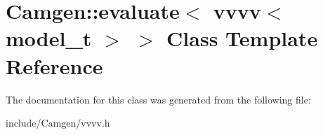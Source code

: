 \hypertarget{a00209}{\section{Camgen\-:\-:evaluate$<$ vvvv$<$ model\-\_\-t $>$ $>$ Class Template Reference}
\label{a00209}
}


The documentation for this class was generated from the following file\-:\begin{DoxyCompactItemize}
\item 
include/\-Camgen/vvvv.\-h\end{DoxyCompactItemize}
